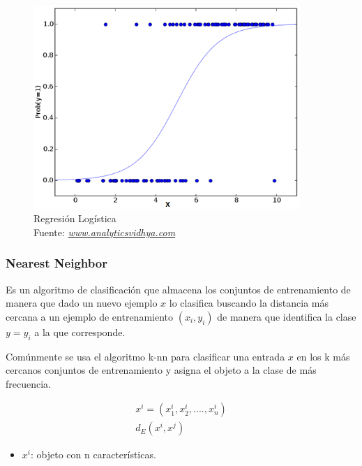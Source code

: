  \begin{figure}[H]
 	\centering
 	\includegraphics[width=0.9\textwidth]{Figures/logistic.png}
 	\caption{Regresión Logística \\ Fuente:  \href{https://www.analyticsvidhya.com/blog/2017/09/common-machine-learning-algorithms/}{\textit{www.analyticsvidhya.com}}}
 	\label{Regresión Logistica}
 \end{figure} 
\subsubsection*{Nearest Neighbor}
Es un algoritmo de clasificación que almacena los conjuntos de entrenamiento de manera que dado un nuevo ejemplo $x$ lo clasifica buscando la distancia  más cercana a un ejemplo de entrenamiento $(x_{i},y_{i})$ de manera que identifica la clase $y=y_{i}$ a la que corresponde.

 Comúnmente se usa el algoritmo k-nn para clasificar una entrada $x$ en los k más cercanos conjuntos de entrenamiento y asigna el objeto a la clase de más frecuencia.

  \begin{equation}
  \label{eq:t12}
  \begin{aligned}
  x^i=(x_{1}^i,x_{2}^i,.... ,x_{n}^i)\\
  d_{E}(x^i,x^j)
  \end{aligned}
  \end{equation}
\begin{itemize}
	\item $x^i$: objeto con n características.
	
\end{itemize}

